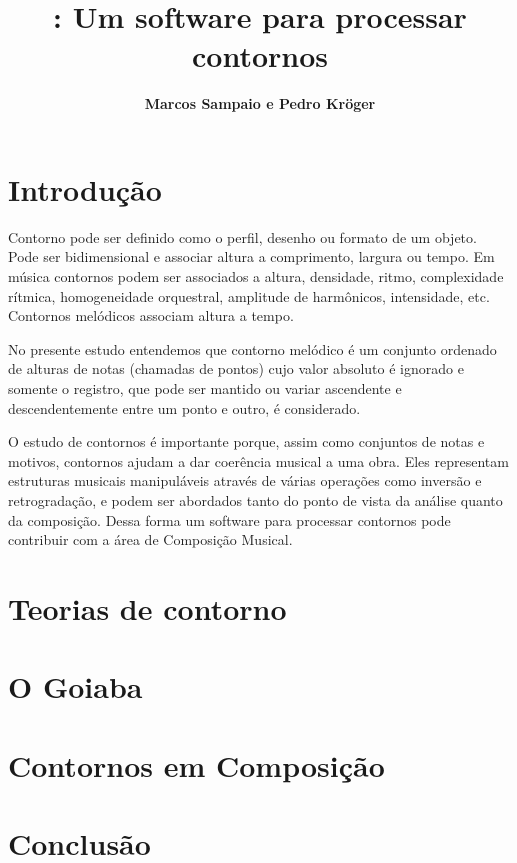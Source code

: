 \documentclass{sciposter}
\title{\goiaba{}: Um software para processar contornos}
\author{\textbf{Marcos Sampaio e Pedro Kröger}}
\institute{Genos---Grupo de pesquisa em computação musical}
\begin{document}



\maketitle

\begin{multicols}{3}

\section{Introdução}

Contorno pode ser definido como o perfil, desenho ou formato de um
objeto. Pode ser bidimensional e associar altura a comprimento,
largura ou tempo. Em música contornos podem ser associados a altura,
densidade, ritmo, complexidade rítmica, homogeneidade orquestral,
amplitude de harmônicos, intensidade, etc. Contornos melódicos
associam altura a tempo.

No presente estudo entendemos que contorno melódico é um conjunto
ordenado de alturas de notas (chamadas de pontos) cujo valor absoluto
é ignorado e somente o registro, que pode ser mantido ou variar
ascendente e descendentemente entre um ponto e outro, é considerado.

O estudo de contornos é importante porque, assim como conjuntos de
notas e motivos, contornos ajudam a dar coerência musical a uma
obra. Eles representam estruturas musicais manipuláveis através de
várias operações como inversão e retrogradação, e podem ser abordados
tanto do ponto de vista da análise quanto da composição. Dessa forma
um software para processar contornos pode contribuir com a área de
Composição Musical.

\section{Teorias de contorno}

\section{O Goiaba}


\end{multicols}

\begin{center}

\begin{multicols}{2}

\end{multicols}

\end{center}

\begin{multicols}{3}

\section{Contornos em Composição}

\section{Conclusão}

\renewcommand{\refname}{Bibliografia}




\end{multicols}
\end{document}
